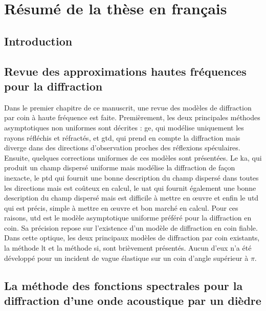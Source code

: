 \chapter{Résumé de la thèse en français}
\section*{Introduction}

\section{Revue des approximations hautes fréquences pour la diffraction}

Dans le premier chapitre de ce manuscrit, une revue des modèles de diffraction par coin à haute fréquence est faite. Premièrement, les deux principales méthodes asymptotiques non uniformes sont décrites : \acrfull{ge}, qui modélise uniquement les rayons réfléchis et réfractés, et \acrfull{gtd}, qui prend en compte la diffraction mais diverge dans des directions d'observation proches des réflexions spéculaires. Ensuite, quelques corrections uniformes de ces modèles sont présentées. Le \acrfull{ka}, qui produit un champ dispersé uniforme mais modélise la diffraction de façon inexacte, le \acrfull{ptd} qui fournit une bonne description du champ dispersé dans toutes les directions mais est coûteux en calcul, le \acrfull{uat} qui fournit également une bonne description du champ dispersé mais est difficile à mettre en œuvre et enfin le \acrfull{utd} qui est précis, simple à mettre en œuvre et bon marché en calcul. Pour ces raisons, \acrshort{utd} est le modèle asymptotique uniforme préféré pour la diffraction en coin. Sa précision repose sur l'existence d'un modèle de diffraction en coin fiable. Dans cette optique, les deux principaux modèles de diffraction par coin existants, la méthode \acrfull{lt} et la méthode \acrfull{si}, sont brièvement présentés. Aucun d'eux n'a été développé pour un incident de vague élastique sur un coin d'angle supérieur à $\pi$.

\section{La méthode des fonctions spectrales pour la diffraction d'une onde acoustique par un dièdre}

